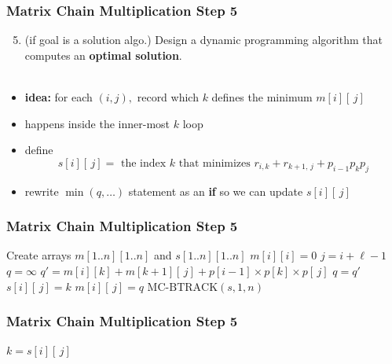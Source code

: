 \documentclass[10pt,aspectratio=169]{beamer}
\newcommand{\stanza}{ \\~\ }
\begin{document}
\begin{frame} \frametitle{Matrix Chain Multiplication Step 5}
  \begin{enumerate}
    \setcounter{enumi}{4}
    \item (if goal is a solution algo.) Design a dynamic programming algorithm that computes an \textbf{optimal solution}.
    \stanza
  \end{enumerate}

  \begin{itemize}
    \item \textbf{idea:} for each $(i, j),$ record which $k$ defines the minimum $m[i][\, j]$
    \item happens inside the inner-most $k$ loop
    \item define
      \[ s[i][\, j] = \text{ the index } k \text{ that minimizes } r_{i, k} + r_{k+1, \, j} + p_{i-1} p_k p_j  \]
    \item rewrite $\min(q, \ldots)$ statement as an \textbf{if} so we can update $s[i][\, j]$
  \end{itemize}
\end{frame}

\begin{frame} \frametitle{Matrix Chain Multiplication Step 5}
  {\scriptsize
  \begin{algorithmic}[1]
    \State Create arrays $m[1..n][1..n]$ and $s[1..n][1..n]$
      \State $m[i][i] = 0$ 
    \EndFor
     
        \State $j = i + \ell - 1$
        \State $q=\infty$
          \State $q' = m[i][k] + m[k+1][\,j] + p[i-1] \times p[k] \times p[\,j]$
            \State $q = q'$
            \State $s[i][\, j] = k$
          \EndIf
        \EndFor
        \State $m[i][\,j] = q$
      \EndFor
    \EndFor
    \State \Return $\text{MC-BTRACK}(s, 1, n)$
    \EndFunction
  \end{algorithmic}
  }
\end{frame}

\begin{frame} \frametitle{Matrix Chain Multiplication Step 5}
  {\scriptsize
  \begin{algorithmic}[1]
     
      \State {}
    \EndIf
    \State $k = s[i][\, j]$
    \State {}
    \EndFunction
  \end{algorithmic}
  }
\end{frame}
\end{document}
